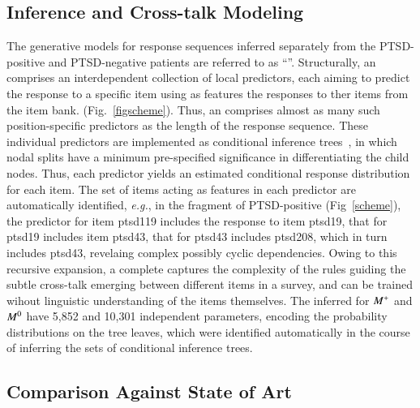 \documentclass[onecolumn,10pt]{IEEEtran}
\begin{document}
\subsection*{\qnet Inference and Cross-talk Modeling}
The generative models for response sequences inferred separately from the PTSD-positive and PTSD-negative patients are referred to as ``''. Structurally, an \qnet comprises an interdependent collection of  local predictors, each aiming to predict the  response to a specific item using as features  the responses to ther items from the item bank.     (Fig.~\ref{figscheme}). Thus,  an \qnet comprises almost as many such  position-specific predictors as the length of the response sequence. These individual predictors are implemented as conditional inference trees~\cite{Hothorn06unbiasedrecursive}, in which  nodal splits  have  a minimum pre-specified significance in differentiating the  child nodes. Thus, each predictor yields an estimated conditional response distribution  for each item. The set of items acting as features in each predictor are automatically identified, \textit{e.g.}, in the fragment of PTSD-positive  \qnet (Fig~\ref{scheme}), the predictor for item ptsd119 includes the response to item ptsd19, that for ptsd19 includes item ptsd43, that for ptsd43 includes ptsd208, which in turn includes ptsd43, revelaing complex possibly cyclic dependencies. Owing to this recursive expansion,  a complete \qnet  captures the complexity of the rules guiding the subtle cross-talk emerging between different items in a survey, and can be trained wihout linguistic understanding of the items themselves. The  inferred for $M^+$ and $M^0$ have 5,852 and  10,301 independent parameters, encoding the probability distributions on the tree leaves,  which were identified automatically in the course of inferring the sets of conditional inference trees.



%
\subsection*{Comparison Against State of Art}
\end{document}
